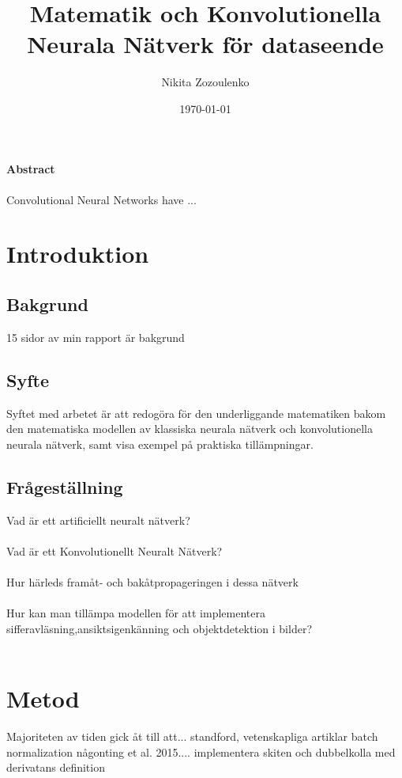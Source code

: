 \documentclass[a4paper,11pt,twoside]{article}
\title{Matematik och Konvolutionella Neurala Nätverk för dataseende}
\author{Nikita Zozoulenko}
\date{\today}
\begin{document}
\begin{titlepage}
\maketitle
\end{titlepage}


\Large{\textbf{Abstract}}\\\\
Convolutional Neural Networks have ...
\newpage

\tableofcontents

\section{Introduktion}

\subsection{Bakgrund}
15 sidor av min rapport är bakgrund
\subsection{Syfte}
Syftet med arbetet är att redogöra för den underliggande matematiken bakom den matematiska modellen av klassiska neurala nätverk och konvolutionella neurala nätverk, samt visa exempel på praktiska tillämpningar.
\subsection{Frågeställning}
Vad är ett artificiellt neuralt nätverk?\\\\
Vad är ett Konvolutionellt Neuralt Nätverk?\\\\
Hur härleds framåt- och bakåtpropageringen i dessa nätverk \\\\
Hur kan man tillämpa modellen för att implementera sifferavläsning,ansiktsigenkänning och objektdetektion i bilder?\\\\


\newpage
\section{Metod}

Majoriteten av tiden gick åt till att... standford, vetenskapliga artiklar batch normalization någonting et al. 2015.... implementera skiten och dubbelkolla med derivatans definition
\end{document}
